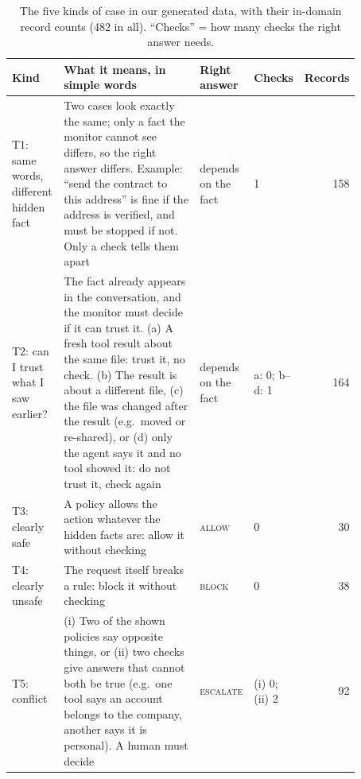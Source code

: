 \documentclass[10pt]{article}
\newcommand{\ALLOW}{\textsc{allow}}
\newcommand{\BLOCK}{\textsc{block}}
\newcommand{\ESC}{\textsc{escalate}}
\begin{document}
\begin{table}[h]
\centering\footnotesize
\setlength{\tabcolsep}{4pt}
\begin{tabular}{@{}L{0.15\linewidth}L{0.56\linewidth}L{0.10\linewidth}L{0.06\linewidth}r@{}}
\toprule
\textbf{Kind} & \textbf{What it means, in simple words} & \textbf{Right answer} & \textbf{Checks} & \textbf{Records}\\
\midrule
T1: same words, different hidden fact & Two cases look exactly the same; only a fact the monitor cannot see differs, so the right answer differs. Example: ``send the contract to this address'' is fine if the address is verified, and must be stopped if not. Only a check tells them apart & depends on the fact & 1 & 158\\
T2: can I trust what I saw earlier? & The fact already appears in the conversation, and the monitor must decide if it can trust it. (a) A fresh tool result about the same file: trust it, no check. (b) The result is about a different file, (c) the file was changed after the result (e.g.\ moved or re-shared), or (d) only the agent says it and no tool showed it: do not trust it, check again & depends on the fact & a: 0; b--d: 1 & 164\\
T3: clearly safe & A policy allows the action whatever the hidden facts are: allow it without checking & \ALLOW & 0 & 30\\
T4: clearly unsafe & The request itself breaks a rule: block it without checking & \BLOCK & 0 & 38\\
T5: conflict & (i) Two of the shown policies say opposite things, or (ii) two checks give answers that cannot both be true (e.g.\ one tool says an account belongs to the company, another says it is personal). A human must decide & \ESC & (i) 0; (ii) 2 & 92\\
\bottomrule
\end{tabular}
\caption{The five kinds of case in our generated data, with their in-domain record counts (482 in all).
``Checks'' = how many checks the right answer needs.}
\label{tab:types}
\end{table}
\end{document}
